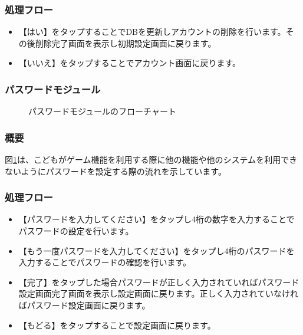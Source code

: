 \documentclass[a4j]{jarticle}
\begin{document}
\subsubsection*{処理フロー}
\begin{itemize}
\item 【はい】をタップすることでDBを更新しアカウントの削除を行います。その後削除完了画面を表示し初期設定画面に戻ります。
\item 【いいえ】をタップすることでアカウント画面に戻ります。
\end{itemize}

\subsubsection{パスワードモジュール\label{パスワード}} %
\begin{figure}[H]
    \begin{center}
    \caption {パスワードモジュールのフローチャート}
    \label{設定_パスワード}
    \end{center}
\end{figure}
\subsubsection*{概要}
図\ref{設定_パスワード}は、こどもがゲーム機能を利用する際に他の機能や他のシステムを利用できないようにパスワードを設定する際の流れを示しています。
\subsubsection*{処理フロー}
\begin{itemize}
\item 【パスワードを入力してください】をタップし4桁の数字を入力することでパスワードの設定を行います。
\item【もう一度パスワードを入力してください】をタップし4桁のパスワードを入力することでパスワードの確認を行います。
\item 【完了】をタップした場合パスワードが正しく入力されていればパスワード設定画面完了画面を表示し設定画面に戻ります。正しく入力されていなければパスワード設定画面に戻ります。
\item 【もどる】をタップすることで設定画面に戻ります。
\end{itemize}
\end{document}
